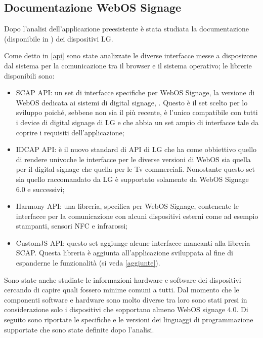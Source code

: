 \subsection{Documentazione WebOS Signage}\label{WebOS_doc}

Dopo l'analisi dell'applicazione preesistente è stata studiata la documentazione (disponibile in \cite{LgDoc}) dei dispositivi LG.

Come detto in \ref*{api} sono state analizzate le diverse interfacce messe a disposizone dal sistema per la comunicazione tra il browser e il sistema operativo; le librerie disponibili sono: 
\begin{itemize}
    \item SCAP API: un set di interfacce specifiche per WebOS Signage, la versione di WebOS dedicata ai sistemi di digital signage, . Questo è il set scelto per lo sviluppo poiché, sebbene non sia il più recente, è l'unico compatibile con tutti i device di digital signage di LG e che abbia un set ampio di interfacce tale da coprire i requisiti dell'applicazione;
    \item IDCAP API: è il nuovo standard di API di LG che ha come obbiettivo quello di rendere univoche le interfacce per le diverse versioni di WebOS sia quella per il digital signage che quella per le Tv commerciali. Nonostante questo set sia quello raccomandato da LG è supportato solamente da WebOS Signage 6.0 e successivi;
    \item Harmony API: una libreria, specifica per WebOS Signage, contenente le interfacce per la comunicazione con alcuni dispositivi esterni come ad esempio stampanti, sensori NFC e infrarossi;
    \item CustomJS API: questo set aggiunge alcune interfacce mancanti alla libreria SCAP. Questa libreria è aggiunta all'applicazione sviluppata al fine di espanderne le funzionalità (si veda \ref*{aggiunte}).
\end{itemize}

Sono state anche studiate le informazioni hardware e software dei dispositivi cercando di capire quali fossero  minime comuni a tutti. Dal momento che le componenti software e hardware sono molto diverse tra loro sono stati presi in considerazione solo i dispositivi che sopportano almeno WebOS signage 4.0. Di seguito sono riportate le specifiche e le versioni dei linguaggi di programmazione supportate che sono state definite dopo l'analisi.

